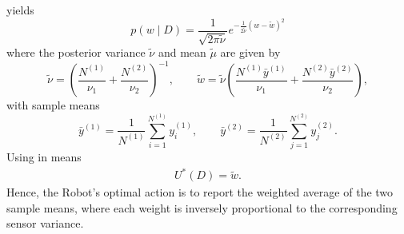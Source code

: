 \begin{example}
	yields
	\begin{equation}
		p(w \mid D) =\frac{1}{\sqrt{2\pi\tilde{\nu}}} e^{-\frac{1}{2\tilde{\nu}}(w - \tilde{w})^2}
		\label{eq:posterior1}
	\end{equation}
	where the posterior variance \(\tilde{\nu}\) and mean \(\tilde{\mu}\) are given by
	\begin{equation}
		\tilde{\nu}
		= \left(\frac{N^{(1)}}{\nu_1} + \frac{N^{(2)}}{\nu_2}\right)^{-1},
		\qquad
		\tilde{w}
		= \tilde{\nu}\left(\frac{N^{(1)}\bar{y}^{(1)}}{\nu_1} + \frac{N^{(2)}\bar{y}^{(2)}}{\nu_2}\right),
	\end{equation}
	with sample means
	\begin{equation}
		\bar{y}^{(1)} = \frac{1}{N^{(1)}}\sum_{i=1}^{N^{(1)}} y_i^{(1)},
		\qquad
		\bar{y}^{(2)} = \frac{1}{N^{(2)}}\sum_{j=1}^{N^{(2)}} y_j^{(2)}.
	\end{equation}
	Using  in  means
	\begin{equation}
		\begin{split}
			U^*(D) = \tilde{w}.
		\end{split}
	\end{equation}
	Hence, the Robot’s optimal action is to report the weighted average of the two sample means, where each weight is inversely proportional to the corresponding sensor variance.
\end{example}

